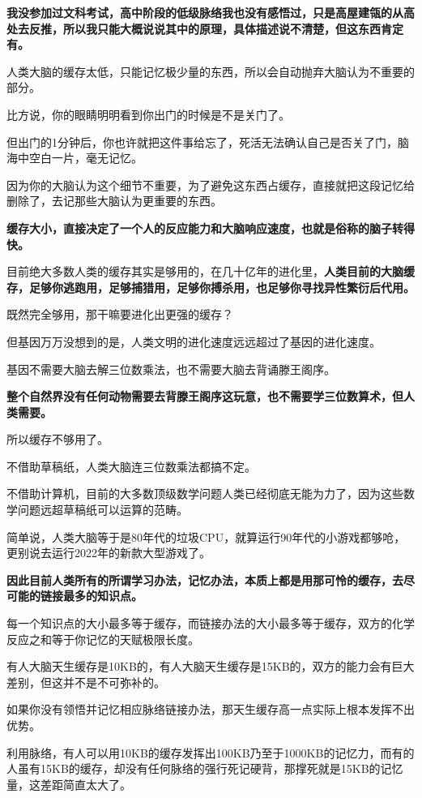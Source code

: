 \documentclass[UTF8, 11pt, oneside]{ctexart}
\newcommand{\zd}[1]{\textbf{\textcolor[RGB]{123,12,0}{#1}}} %
\begin{document}
\zd{我没参加过文科考试，高中阶段的低级脉络我也没有感悟过，只是高屋建瓴的从高处去反推，所以我只能大概说说其中的原理，具体描述说不清楚，但这东西肯定有。}

人类大脑的缓存太低，只能记忆极少量的东西，所以会自动抛弃大脑认为不重要的部分。

比方说，你的眼睛明明看到你出门的时候是不是关门了。

但出门的1分钟后，你也许就把这件事给忘了，死活无法确认自己是否关了门，脑海中空白一片，毫无记忆。

因为你的大脑认为这个细节不重要，为了避免这东西占缓存，直接就把这段记忆给删除了，去记那些大脑认为更重要的东西。

\zd{缓存大小，直接决定了一个人的反应能力和大脑响应速度，也就是俗称的脑子转得快。}

目前绝大多数人类的缓存其实是够用的，在几十亿年的进化里，\zd{人类目前的大脑缓存，足够你逃跑用，足够捕猎用，足够你搏杀用，也足够你寻找异性繁衍后代用。}

既然完全够用，那干嘛要进化出更强的缓存？

但基因万万没想到的是，人类文明的进化速度远远超过了基因的进化速度。

基因不需要大脑去解三位数乘法，也不需要大脑去背诵滕王阁序。

\zd{整个自然界没有任何动物需要去背滕王阁序这玩意，也不需要学三位数算术，但人类需要。}

所以缓存不够用了。

不借助草稿纸，人类大脑连三位数乘法都搞不定。

不借助计算机，目前的大多数顶级数学问题人类已经彻底无能为力了，因为这些数学问题远超草稿纸可以运算的范畴。

简单说，人类大脑等于是80年代的垃圾CPU，就算运行90年代的小游戏都够呛，更别说去运行2022年的新款大型游戏了。

\zd{因此目前人类所有的所谓学习办法，记忆办法，本质上都是用那可怜的缓存，去尽可能的链接最多的知识点。}

每一个知识点的大小最多等于缓存，而链接办法的大小最多等于缓存，双方的化学反应之和等于你记忆的天赋极限长度。

有人大脑天生缓存是10KB的，有人大脑天生缓存是15KB的，双方的能力会有巨大差别，但这并不是不可弥补的。

如果你没有领悟并记忆相应脉络链接办法，那天生缓存高一点实际上根本发挥不出优势。

利用脉络，有人可以用10KB的缓存发挥出100KB乃至于1000KB的记忆力，而有的人虽有15KB的缓存，却没有任何脉络的强行死记硬背，那撑死就是15KB的记忆量，这差距简直太大了。
\end{document}
